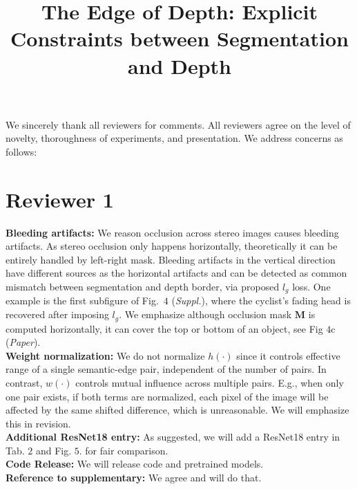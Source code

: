 \documentclass[10pt,twocolumn,letterpaper]{article}
\begin{document}
\title{The Edge of Depth: Explicit Constraints between Segmentation and Depth}  %

\maketitle
\thispagestyle{empty}


\noindent We sincerely thank all reviewers for comments.
All reviewers agree on the level of novelty, thoroughness of experiments, and presentation.
We address concerns as follows:
\vspace{-3.5mm}
\section*{Reviewer 1}
\vspace{-1.5mm}
\noindent\textbf{Bleeding artifacts:} 
We reason occlusion across stereo images causes bleeding artifacts. As stereo occlusion only happens horizontally, theoretically it can be entirely handled by left-right mask. 
Bleeding artifacts in the vertical direction have different sources as the horizontal artifacts and can be detected as common mismatch between segmentation and depth border, via proposed $l_g$ loss. 
One example is the first subfigure of Fig.~$4$ (\textit{Suppl.}), where the cyclist's fading head is recovered after imposing $l_g$. 
We emphasize  although occlusion mask $\mathbf{M}$ is computed horizontally, it can cover the top or bottom of an object, see Fig $4$c (\textit{Paper}).\\
\noindent\textbf{Weight normalization:} 
We do not normalize $h(\cdot)$ since it controls effective range of a single semantic-edge pair, independent of the number of pairs. 
In contrast, $w(\cdot)$ controls mutual influence across multiple pairs. 
E.g., when only one pair exists, if both terms are normalized, each pixel of the image will be affected by the same shifted difference, which is unreasonable. 
We will emphasize this in revision. 
\\
\noindent\textbf{Additional ResNet18 entry:} 
As suggested, we will add a ResNet18 entry in Tab. $2$ and Fig. $5$. for fair comparison. \\
\noindent\textbf{Code Release:} We will release code and pretrained models.\\
\noindent\textbf{Reference to supplementary:} 
We agree and will do that.
\end{document}
